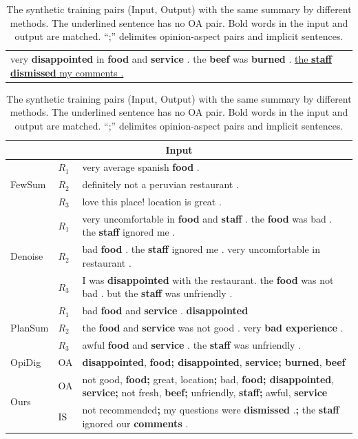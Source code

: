 \begin{table}[th]
	\centering
	\scriptsize
	
	\begin{tabular}{|p{7.2cm}|}
		\hline \rule{0pt}{10pt}
		\makecell[c]{\bf Output (Sampled Summary)} \\
		\hline
		very \textbf{disappointed} in \textbf{food} and \textbf{service} . the \textbf{beef} was \textbf{burned} . 
		\underline{the \textbf{staff} \textbf{dismissed} my comments .}
		\vspace{0.2em}\\
		\hline
	\end{tabular}


	\begin{tabular}{|m{0.95cm}|m{0.3cm}<{\centering}|m{5.1cm}|}
	\hline
	\multicolumn{3}{|c|}{\rule{0pt}{10pt} \bf Input}  \\	
	\hline
	\multirow{3}{0.1cm}{FewSum} & $R_1$ & very average spanish \textbf{food} .
	\\
	\cline{2-3}
	& $R_2$ &definitely not a peruvian restaurant
.
	\\
	\cline{2-3}
	& $R_3$ &love this place! location is great
.
	\\
    \hline
	\multirow{3}{0.1cm}{Denoise} & $R_1$ & very uncomfortable in \textbf{food} and \textbf{staff} . the \textbf{ food} was bad . the \textbf{staff} ignored me .
	\\
	\cline{2-3}
	& $R_2$ & bad \textbf{food} . the \textbf{staff} ignored me . very uncomfortable in restaurant .\\
	\cline{2-3}
	& $R_3$ &I was \textbf{disappointed} with the restaurant. the \textbf{food} was not bad . but the \textbf{staff} was unfriendly .
	\\
	\hline
	\multirow{3}{0.1cm}{PlanSum} & $R_1$ & bad \textbf{food} and \textbf{service} . \textbf{disappointed} \\
	\cline{2-3}
	& $R_2$& the \textbf{food} and \textbf{service} was not good . very \textbf{bad experience} .
\\
	\cline{2-3}
	& $R_3$ &awful \textbf{food} and \textbf{service} . the \textbf{staff} was unfriendly .
	\\
	\hline
	OpiDig & OA & \textbf{disappointed}, \textbf{food; disappointed}, \textbf{service; burned}, \textbf{beef}
	\\
	\hline
	\multirow{2}{0.1cm}{Ours} & OA &not good, \textbf{food;} great, location\textbf{;} bad, \textbf{food; disappointed}, \textbf{service;} not fresh, \textbf{beef;} unfriendly, \textbf{staff;} awful, \textbf{service}\\
	\cline{2-3}
	& IS &not recommended\textbf{;} my questions were \textbf{dismissed} .\textbf{;} the \textbf{staff} ignored our \textbf{comments} .\\
	\hline
\end{tabular}
	\caption{The synthetic training pairs (Input, Output) with the same summary by different methods. The underlined sentence has no OA pair.  
	Bold words in the input and output are matched.
	``;'' delimites opinion-aspect pairs and implicit sentences.
	}\label{tab:previous_data}  
\end{table}

